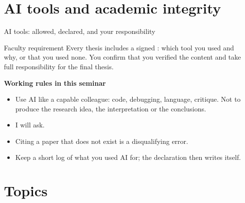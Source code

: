\documentclass[aspectratio=169,11pt,t]{beamer}
\begin{document}
\section{AI tools and academic integrity}

\begin{frame}{AI tools: allowed, declared, and your responsibility}
  \begin{block}{Faculty requirement}
    Every thesis includes a signed : which tool you used
    and why, or that you used none. You confirm that you verified the content and take full
    responsibility for the final thesis.
  \end{block}

  \medskip
  \textbf{Working rules in this seminar}
  \begin{itemize}
    \item Use AI like a capable colleague: code, debugging, language, critique. Not to produce
          the research idea, the interpretation or the conclusions.
    \item {} I will ask.
    \item {} Citing a paper that does not exist is a disqualifying error.
    \item Keep a short log of what you used AI for; the declaration then writes itself.
  \end{itemize}
\end{frame}

\section{Topics}
\end{document}
